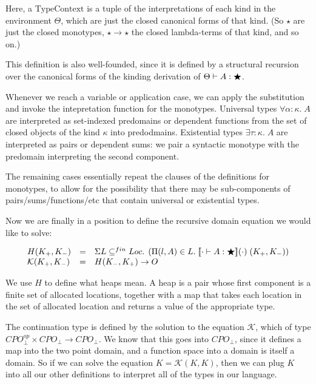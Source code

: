 Here, a $\mbox{TypeContext}$ is a tuple of the interpretations of
each kind in the environment $\Theta$, which are just the closed 
canonical forms of that kind. (So $\star$ are just the closed 
monotypes, $\star \to \star$ the closed lambda-terms of that kind,
and so on.)

This definition is also well-founded, since it is defined by a
structural recursion over the canonical forms of the kinding
derivation of $\judgeWK{A}{\bigstar}$. 

Whenever we reach a variable or application case, we can apply the
substitution and invoke the intepretation function for the
monotypes. Universal types $\forall \alpha:\kappa.\;A$ are interpreted
as set-indexed predomains or dependent functions from the set of
closed objects of the kind $\kappa$ into predodmains. Existential
types $\exists \tau:\kappa.\;A$ are interpreted as pairs or dependent
sums: we pair a syntactic monotype with the predomain interpreting the
second component.

The remaining cases essentially repeat the clauses of the definitions
for monotypes, to allow for the possibility that there may be
sub-components of pairs/sums/functions/etc that contain universal or
existential types.

Now we are finally in a position to define the recursive domain equation we 
would like to solve:

\begin{displaymath}
\begin{array}{lcl}
H(K_+,K_-) & = & \Sigma L \subseteq^{fin} Loc.\; 
                    \left(\Pi (l,A) \in L.\; 
                             \interp{\judgeWK[\cdot]{A}{\bigstar}}(\cdot)\;(K_+,K_-) 
                    \right)\\

\mathcal{K}(K_+,K_-) & = & H(K_-,K_+) \to O \\    
\end{array}
\end{displaymath}

We use $H$ to define what heaps mean. A heap is a pair whose first
component is a finite set of allocated locations, together with a map
that takes each location in the set of allocated location and returns
a value of the appropriate type.

The continuation type is defined by the solution to the equation
$\mathcal{K}$, which of type $CPO^{op}_\bot \times CPO_\bot \to
CPO_\bot$. We know that this goes into $CPO_\bot$, since it defines a
map into the two point domain, and a function space into a domain is
itself a domain. So if we can solve the equation $K = \mathcal{K}(K,
K)$, then we can plug $K$ into all our other definitions to interpret
all of the types in our language.

